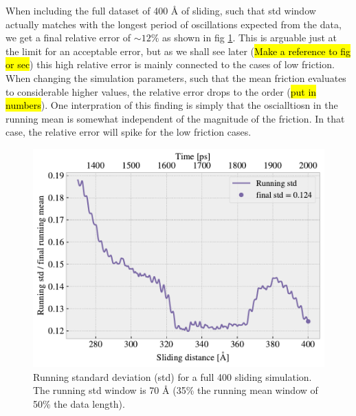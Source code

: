 When including the full dataset of 400 Å of sliding, such that std window actually matches with the longest period of oscillations expected from the data, we get a final relative error of $\sim 12 \%$ as shown in fig \ref{fig:runstd_long}. This is arguable just at the limit for an acceptable error, but as we shall see later (\hl{Make a reference to fig or sec}) this high relative error is mainly connected to the cases of low friction. When changing the simulation parameters, such that the mean friction evaluates to considerable higher values, the relative error drops to the order (\hl{put in numbers}). One interpration of this finding is simply that the oscialltiosn in the running mean is somewhat independent of the magnitude of the friction. In that case, the relative error will spike for the low friction cases. 


\begin{figure}[H]
  \centering
  \includegraphics[width=0.6\linewidth]{figures/baseline/Ff_runstd_long.pdf}
  \caption{Running standard deviation (std) for a full \SI{400}{{}} sliding simulation. The running std window is 70 Å (35\% the running mean window of 50\% the data length).}
  \label{fig:runstd_long}
\end{figure}


